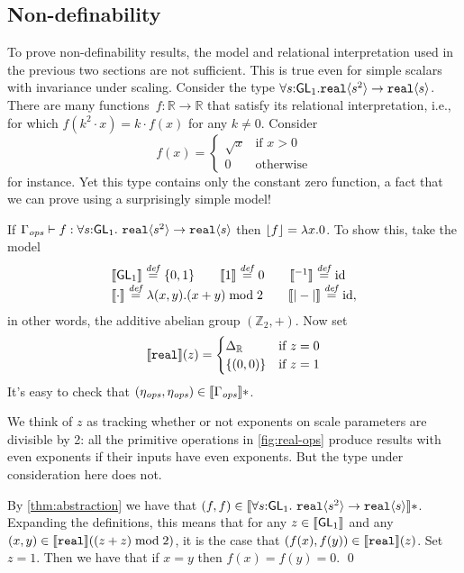 \subsection{Non-definability}
\label{sec:types-indexed-abelian-groups-indef}

\newcommand{\Grp}{\mathit{Gr}}
To prove non-definability results, the model and relational interpretation
used in the previous two sections are not sufficient.
This is true even for simple scalars with invariance under scaling.
Consider the type 
$\forall s \mathord: \mathsf{GL}_1.\textup{\texttt{real}}\langle s^2 \rangle \to \textup{\texttt{real}}\langle s \rangle$. 
There are many functions~$f: \mathbb R \to \mathbb R$
that satisfy its relational interpretation, i.e., for which $f(k^2\cdot x) = k\cdot f(x)$ for 
any $k\neq 0$.
Consider 
\[
f(x) = \begin{cases}\sqrt x & \text{if }x > 0\\0&\text{otherwise}\end{cases}
\]
for instance. Yet this type contains only the constant zero function, a fact that
we can prove using a surprisingly simple model!

\begin{example}\label{ex:sqrt-root-nondef}
If  $\Gamma_{\mathit{ops}} \vdash f : \forall s \mathord: \mathsf{GL}_1.\
\textup{\texttt{real}}\langle s^2 \rangle \to \textup{\texttt{real}}\langle s \rangle$ 
then $\left\lfloor{f}\right\rfloor = \lambda x.0$.
To show this, take the model
\[
\begin{array}{l}
\llbracket \mathsf{GL}_1 \rrbracket \stackrel{\mathit{def}}= \{0,1\}\qquad
\llbracket 1 \rrbracket \stackrel{\mathit{def}}= 0 \qquad
\llbracket {}^{-1} \rrbracket  \stackrel{\mathit{def}}= \mathrm{id}\\
\llbracket \cdot \rrbracket \stackrel{\mathit{def}}= \lambda(x,y).(x+y)\mathrel{\mathrm{mod}} 2
\qquad
\llbracket |-| \rrbracket \stackrel{\mathit{def}}= \mathrm{id},

\end{array}
\]
in other words, the additive abelian group $(\mathbb Z_2, +)$. 
Now set
\[
\llbracket \textup{\texttt{real}} \rrbracket(z) = 
  \begin{cases} \Delta_{\mathbb R} & \text{if }z=0\\
                      \{(0,0)\} & \text{if }z=1
\end{cases}
\]
It's easy to check that $(\eta_{\mathit{ops}},\eta_{\mathit{ops}})\in\llbracket \Gamma_{\mathit{ops}} \rrbracket*$.

We think of $z$ as tracking whether or not exponents on scale
parameters are divisible by 2: all the primitive operations in
\autoref{fig:real-ops} produce results with even exponents if their
inputs have even exponents. But the type under consideration here does
not.

By \autoref{thm:abstraction} we have that $(f,f)\in\llbracket \forall s
  \mathord: \mathsf{GL}_1.\ \textup{\texttt{real}}\langle s^2 \rangle \to \textup{\texttt{real}}\langle s \rangle \rrbracket *$.
Expanding the definitions, this means that for any
$z\in\llbracket \mathsf{GL}_1 \rrbracket$ and any
$(x,y)\in\llbracket \textup{\texttt{real}} \rrbracket((z+z)\mathrel\textrm{mod}2)$, it is the case that
$(f(x),f(y))\in\llbracket \textup{\texttt{real}} \rrbracket(z)$. Set $z = 1$.  
Then we have that if $x=y$ then $f(x)=f(y)=0$.
\qed
\end{example}

